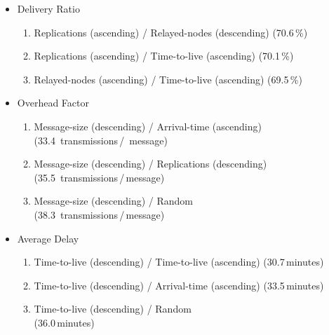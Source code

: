 \documentclass[conference,10pt,letterpaper,final]{IEEEtran}
\begin{document}
\begin{itemize}[leftmargin=*]
 \item Delivery Ratio
 \vspace{0.1cm}
 \begin{enumerate}
  \item Replications (ascending) / Relayed-nodes (descending) (70.6\,\%)
  \vspace{0.2cm}
  \item Replications (ascending) / Time-to-live (ascending) (70.1\,\%)
  \vspace{0.2cm}
  \item Relayed-nodes (ascending) / Time-to-live (ascending) (69.5\,\%)
  \vspace{0.2cm}
 \end{enumerate}

 \vspace{0.2cm}

 \item Overhead Factor
 \vspace{0.1cm}
 \begin{enumerate}
  \item Message-size (descending) / Arrival-time (ascending) (33.4~transmissions\,/\,
  message)
  \vspace{0.2cm}
  \item Message-size (descending) / Replications (descending) (35.5~transmissions\,/\,message)
  \vspace{0.2cm}
  \item Message-size (descending) / Random \\ (38.3~transmissions\,/\,message)
  \vspace{0.2cm}
 \end{enumerate}
 
 \vspace{0.2cm}

 \item Average Delay
 \vspace{0.1cm}
 \begin{enumerate}
  \item Time-to-live (descending) / Time-to-live (ascending) (30.7\,minutes)
  \vspace{0.2cm}
  \item Time-to-live (descending) / Arrival-time (ascending) (33.5\,minutes)
  \vspace{0.2cm}
  \item Time-to-live (descending) / Random \\ (36.0\,minutes)
  \vspace{0.2cm}
 \end{enumerate}


\end{itemize}
\end{document}
